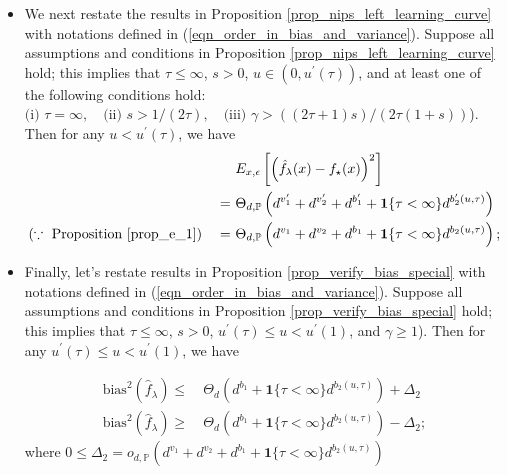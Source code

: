 \documentclass{article}
\theoremstyle{plain}
\theoremstyle{definition}
\theoremstyle{remark}
\begin{document}
\begin{appendix}
\begin{itemize}
\item 
We next restate the results in Proposition \ref{prop_nips_left_learning_curve} with notations defined in (\ref{eqn_order_in_bias_and_variance}). Suppose all assumptions and conditions in Proposition \ref{prop_nips_left_learning_curve} hold; this implies that $\tau \leq \infty$, $s>0$, $u \in (0, u^{\prime}(\tau))$, and at least one of the following conditions hold: $\text{(i) } \tau =\infty, \quad \text{(ii) }s>1/(2\tau), \quad \text{(iii) } \gamma > ((2\tau+1)s) / (2\tau(1+s))$).
Then for any $u < u^{\prime}(\tau)$, we have
\begin{equation}\label{eqn_learning_curve_pre_results_3}
    \begin{aligned}
&~E_{x, \epsilon} \left[ \left(\hat{f}_{\lambda}(x) - f_{\star}(x) \right)^{2} \right]\\
=&~
\Theta_{d, \mathbb{P}} \left( d^{v_1^{\prime}} + d^{v_2^{\prime}} + d^{b_1^{\prime}} + \mathbf{1}\{\tau<\infty\}d^{b_2^{\prime}(u, \tau)}\right)\\
(\because \text{ Proposition \ref{prop_e_1}}) \quad =&~
\Theta_{d, \mathbb{P}} \left( d^{v_1} + d^{v_2} + d^{b_1} + \mathbf{1}\{\tau<\infty\}d^{b_2(u, \tau)}\right);
    \end{aligned}
\end{equation}




\item Finally, let's restate results in Proposition \ref{prop_verify_bias_special} with notations defined in (\ref{eqn_order_in_bias_and_variance}). Suppose all assumptions and conditions in Proposition \ref{prop_verify_bias_special} hold; this implies that $\tau \leq \infty$, $s>0$, $u^{\prime}(\tau) \leq u < u^{\prime}(1)$, and $\gamma \geq 1$).
Then for any $u^{\prime}(\tau) \leq u < u^{\prime}(1)$, we have

\begin{equation}\label{eqn_learning_curve_pre_results_4}
    \begin{aligned}
        \mathrm{bias}^{2}(\hat{f}_{\lambda}) \leq &~ \Theta_{d} \left( d^{b_1} + \mathbf{1}\{\tau<\infty\}d^{b_2(u, \tau)}\right) + \Delta_2\\
        \mathrm{bias}^{2}(\hat{f}_{\lambda}) \geq &~ \Theta_{d} \left( d^{b_1} + \mathbf{1}\{\tau<\infty\}d^{b_2(u, \tau)}\right) - \Delta_2;
    \end{aligned}
\end{equation}
where $0 \leq \Delta_2 = o_{d, \mathbb{P}} \left( d^{v_1} + d^{v_2} + d^{b_1} + \mathbf{1}\{\tau<\infty\}d^{b_2(u, \tau)}\right)$



\end{itemize}
\end{appendix}
\end{document}
